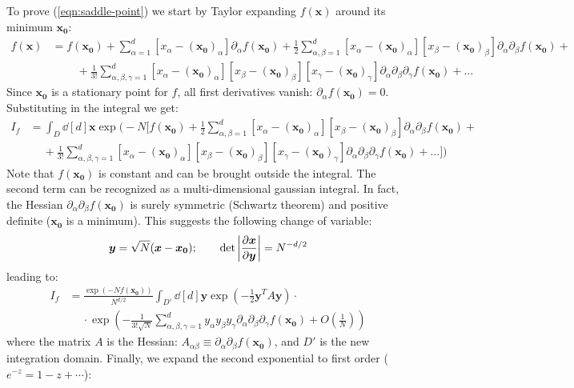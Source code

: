 \documentclass[../template.tex]{subfiles}
\begin{document}
To prove (\ref{eqn:saddle-point}) we start by Taylor expanding $f(\bm{x})$ around its minimum $\bm{x_0}$:
\begin{align*}
    f(\bm{x}) &= f(\bm{x_0}) + \sum_{\alpha=1}^d  [x_\alpha - (\bm{x_{0}})_\alpha] \partial_\alpha f(\bm{x_0}) + \frac{1}{2} \sum_{\alpha,\beta=1}^d [x_\alpha - (\bm{x_{0}})_\alpha] [x_\beta - (\bm{x_{0}})_\beta] \partial_\alpha \partial_\beta f(\bm{x_0}) + \\
    &\qquad\> + \frac{1}{3!} \sum_{\alpha,\beta, \gamma=1}^d [x_\alpha - (\bm{x_{0}})_\alpha][x_\beta - (\bm{x_{0}})_\beta] [x_\gamma - (\bm{x_{0}})_\gamma]\partial_\alpha \partial_\beta \partial_\gamma f(\bm{x_0}) + \dots
\end{align*}
Since $\bm{x_0}$ is a stationary point for $f$, all first derivatives vanish: $\partial_\alpha f(\bm{x_0}) = 0$. Substituting in the integral we get:
\begin{align*}
    I_f &= \int_D \dd[d]{\bm{x}}\exp\Bigg(-N \Big[f(\bm{x_0}) + \frac{1}{2} \sum_{\alpha,\beta=1}^d [x_\alpha - (\bm{x_{0}})_\alpha] [x_\beta - (\bm{x_{0}})_\beta] \partial_\alpha \partial_\beta f(\bm{x_0}) +\\
    &\quad \> + \frac{1}{3!} \sum_{\alpha,\beta, \gamma=1}^d [x_\alpha - (\bm{x_{0}})_\alpha][x_\beta - (\bm{x_{0}})_\beta] [x_\gamma - (\bm{x_{0}})_\gamma]\partial_\alpha \partial_\beta \partial_\gamma f(\bm{x_0}) + \dots
    \Big]\Bigg)
\end{align*}
Note that $f(\bm{x_0})$ is constant and can be brought outside the integral. The second term can be recognized as a multi-dimensional gaussian integral. In fact, the Hessian $\partial_\alpha \partial_\beta f(\bm{x_0})$ is surely symmetric (Schwartz theorem) and positive definite ($\bm{x_0}$ is a minimum). This suggests the following change of variable:
\begin{align}\label{eqn:cov1}
    \bm{y} = \sqrt{N} (\bm{x} - \bm{x_0}); \qquad \operatorname{det}\left|\pdv{\bm{x}}{\bm{y}} \right| = N^{-d/2}
\end{align}
leading to:
\begin{align*}
    I_f &= \frac{\exp(-N f(\bm{x_0}))}{N^{d/2}} \int_{D'} \dd[d]{\bm{y}} \exp\left(-\frac{1}{2} \bm{y}^T A \bm{y}\right) \cdot \\
    &\quad \> \cdot \exp\left( - \frac{1}{3! \sqrt{N}} \sum_{\alpha, \beta, \gamma=1}^d y_\alpha y_\beta y_\gamma \partial_\alpha \partial_\beta \partial_\gamma f(\bm{x_0}) + O\left(\frac{1}{N} \right) \right)
\end{align*}
where the matrix $A$ is the Hessian: $A_{\alpha \beta} \equiv \partial_\alpha \partial_\beta f(\bm{x_0})$, and $D'$ is the new integration domain. Finally, we expand the second exponential to first order ($e^{-z} = 1 - z + \cdots$):
\end{document}
